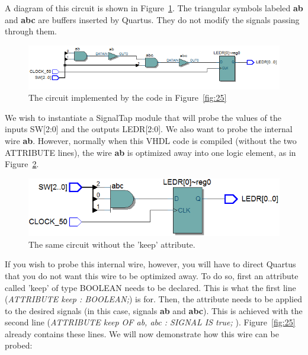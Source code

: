 \documentclass[11pt, twoside, pdftex]{article}
\begin{document}
A diagram of this circuit is shown in Figure~\ref{fig:26}. The triangular symbols labeled
{\bf ab} and {\bf abc} are buffers inserted by Quartus. They do not modify the
signals passing through them.

\begin{figure}[H]
   \begin{center}
      \includegraphics[scale=0.65]{figures/figure26.png}
   \caption{The circuit implemented by the code in Figure~\ref{fig:25}} 
	 \label{fig:26}
	 \end{center}
\end{figure}

We wish to instantiate a SignalTap module that will probe the values of the inputs SW[2:0] and the outputs LEDR[2:0]. We also want to
probe the internal wire {\bf ab}. However, normally when this VHDL code is compiled (without the two ATTRIBUTE lines), the wire {\bf ab} is optimized away into one logic element, as in Figure~\ref{fig:27}.

\begin{figure}[H]
   \begin{center}
      \includegraphics[scale=0.6]{figures/figure27.png}
   \caption{The same circuit without the 'keep' attribute.} 
	 \label{fig:27}
	 \end{center}
\end{figure}

If you wish to probe this internal wire, however, you will have to direct Quartus that you do not want this wire to be optimized away.
To do so, first an attribute called 'keep' of type BOOLEAN needs to be declared. This is what the first line ({\it ATTRIBUTE keep : BOOLEAN;}) is for. Then, the attribute needs to be applied to the desired signals (in this case, signals {\bf ab} and {\bf abc}).
This is achieved with the second line ({\it ATTRIBUTE keep OF ab, abc : SIGNAL IS true; }).
Figure~\ref{fig:25} already contains these lines. We will now demonstrate how this wire can be probed:
\end{document}
